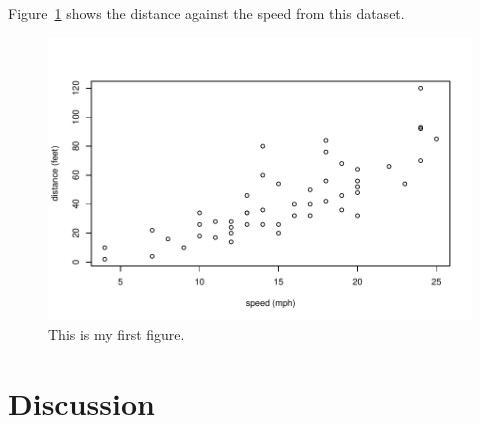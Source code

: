 \documentclass[12pt]{article}
\begin{document}
Figure~\ref{fig:cars} shows the distance against the speed from this dataset.

\begin{figure}
  \centering
  \includegraphics[width=\textwidth]{cars.pdf}
  \caption{This is my first figure.}
  \label{fig:cars}
\end{figure}

\section{Discussion}
\label{sec:disc}
\end{document}
